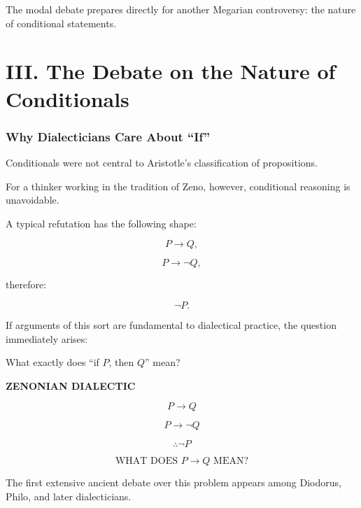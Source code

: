 \documentclass[11pt]{article}
\begin{document}
The modal debate prepares directly for another Megarian
controversy: the nature of conditional statements.


\part*{III. The Debate on the Nature of Conditionals}

\section{Why Dialecticians Care About ``If''}

Conditionals were not central to Aristotle's classification of
propositions.

For a thinker working in the tradition of Zeno, however,
conditional reasoning is unavoidable.

A typical refutation has the following shape:

\[
P\rightarrow Q,
\]

\[
P\rightarrow \neg Q,
\]

therefore:

\[
\neg P.
\]

If arguments of this sort are fundamental to dialectical
practice, the question immediately arises:

\begin{center}
What exactly does ``if \(P\), then \(Q\)'' mean?
\end{center}

\begin{whiteboard}
\textbf{ZENONIAN DIALECTIC}

\[
P\rightarrow Q
\]

\[
P\rightarrow\neg Q
\]

\[
\therefore\neg P
\]

\vspace{0.5em}

\[
\boxed{\text{WHAT DOES }P\rightarrow Q\text{ MEAN?}}
\]
\end{whiteboard}

The first extensive ancient debate over this problem appears
among Diodorus, Philo, and later dialecticians.

\end{document}
